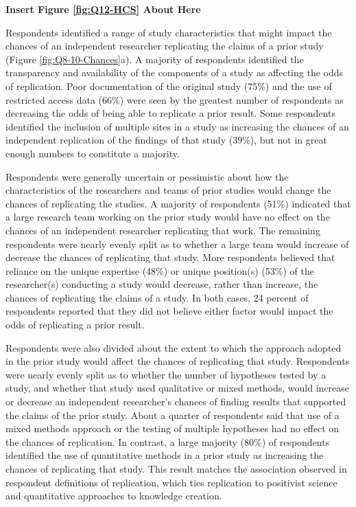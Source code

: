 \documentclass[]{interact}
\theoremstyle{plain}%
\theoremstyle{definition}
\theoremstyle{remark}
\begin{document}
\begin{center}
\textbf{Insert Figure \ref{fig:Q12-HCS} About Here}
\end{center}

Respondents identified a range of study characteristics that might impact the chances of an independent researcher replicating the claims of a prior study (Figure \ref{fig:Q8-10-Chances}a).
A majority of respondents identified the transparency and availability of the components of a study as affecting the odds of replication. 
Poor documentation of the original study (75\%) and the use of restricted access data (66\%) were seen by the greatest number of respondents as decreasing the odds of being able to replicate a prior result. 
Some respondents identified the inclusion of multiple sites in a study as increasing the chances of an independent replication of the findings of that study (39\%), but not in great enough numbers to constitute a majority. 

Respondents were generally uncertain or pessimistic about how the characteristics of the researchers and teams of prior studies would change the chances of replicating the studies. 
A majority of respondents (51\%) indicated that a large research team working on the prior study would have no effect on the chances of an independent researcher replicating that work. 
The remaining respondents were nearly evenly split as to whether a large team would increase of decrease the chances of replicating that study. 
More respondents believed that reliance on the unique expertise (48\%) or unique position(s) (53\%) of the researcher(s)  conducting a study would decrease, rather than increase, the chances of replicating the claims of a study.
In both cases, 24 percent of respondents reported that they did not believe either factor would impact the odds of replicating a prior result.

Respondents were also divided about the extent to which the approach adopted in the prior study would affect the chances of replicating that study. 
Respondents were nearly evenly split as to whether the number of hypotheses tested by a study, and whether that study used qualitative or mixed methods, would increase or decrease an independent researcher's chances of finding results that supported the claims of the prior study.
About a quarter of respondents said that use of a mixed methods approach or the testing of multiple hypotheses had no effect on the chances of replication.
In contrast, a large majority (80\%) of respondents identified the use of quantitative methods in a prior study as increasing the chances of replicating that study. 
This result matches the association observed in respondent definitions of replication, which ties replication to positivist science and quantitative approaches to knowledge creation.   
\end{document}
